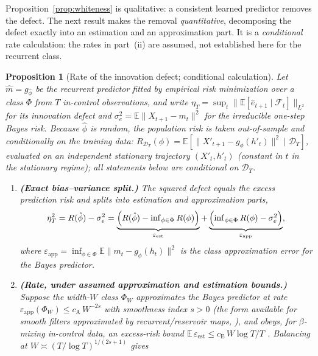 \documentclass[bj,authoryear]{imsart}
\theoremstyle{plain}
\newtheorem{proposition}[theorem]{Proposition}
\theoremstyle{definition}
\newcommand{\E}{\mathbb{E}}
\newcommand{\F}{\mathcal{F}}
\newcommand{\given}{\mid}
\begin{document}
Proposition~\ref{prop:whiteness} is qualitative: a consistent learned
predictor removes the defect.  The next result makes the removal
\emph{quantitative}, decomposing the defect exactly into an estimation and an
approximation part.  It is a \emph{conditional} rate calculation: the rates in
part~(ii) are assumed, not established here for the recurrent class.

\begin{proposition}[Rate of the innovation defect; conditional calculation]
\label{prop:whiteness-rate}
  Let $\hat m=g_{\hat\phi}$ be the recurrent predictor fitted by empirical
  risk minimization over a class $\Phi$ from $T$ in-control observations, and
  write $\eta_T=\sup_t\|\E[\hat e_{t+1}\mid\F_t]\|_{L^2}$ for its innovation
  defect and $\sigma_e^2=\E\|X_{t+1}-m_t\|^2$ for the irreducible one-step Bayes
  risk.  Because $\hat\phi$ is random, the population risk is taken
  out-of-sample and conditionally on the training data:
  $R_{\mathcal D_T}(\phi)=\E[\|X'_{t+1}-g_\phi(h'_t)\|^2\given\mathcal D_T]$,
  evaluated on an independent stationary trajectory $(X'_t,h'_t)$ (constant in
  $t$ in the stationary regime); all statements below are conditional on
  $\mathcal D_T$.
  \begin{enumerate}[label=(\roman*), itemsep=3pt]
    \item \textbf{(Exact bias--variance split.)}  The squared defect equals
      the excess prediction risk and splits into estimation and approximation
      parts,
      \[
        \eta_T^2 = R(\hat\phi)-\sigma_e^2
        = \underbrace{\Bigl(R(\hat\phi)-\textstyle\inf_{\phi\in\Phi}R(\phi)\Bigr)}_{\varepsilon_{\mathrm{est}}}
        + \underbrace{\Bigl(\textstyle\inf_{\phi\in\Phi}R(\phi)-\sigma_e^2\Bigr)}_{\varepsilon_{\mathrm{app}}},
      \]
      where $\varepsilon_{\mathrm{app}}=\inf_{\phi\in\Phi}\E\|m_t-g_\phi(h_t)\|^2$
      is the class approximation error for the Bayes predictor.
    \item \textbf{(Rate, under assumed approximation and estimation bounds.)}
      Suppose the width-$W$ class $\Phi_W$ approximates the Bayes predictor at
      rate $\varepsilon_{\mathrm{app}}(\Phi_W)\le c_{\mathrm A}\,W^{-2s}$ with
      smoothness index $s>0$ (the form available for smooth filters
      approximated by recurrent/reservoir maps,
      \citealp{gonon2020reservoir}), and obeys, for $\beta$-mixing in-control
      data, an excess-risk bound
      $\E\,\varepsilon_{\mathrm{est}}\le c_{\mathrm E}\,W\log T/T$
      \citep{mohri2010stability}.  Balancing at
      $W\asymp(T/\log T)^{1/(2s+1)}$ gives

\end{enumerate}
\end{proposition}
\end{document}

